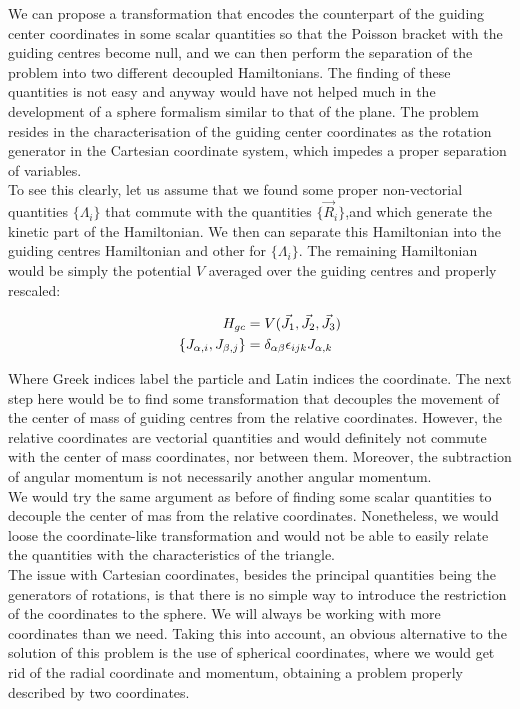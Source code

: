 We can propose a transformation that encodes the counterpart of the guiding center coordinates in some scalar quantities so that the Poisson bracket with the guiding centres become null, and we can then perform the separation of the problem into two different decoupled Hamiltonians. The finding of these quantities is not easy and anyway would have not helped much in the development of a sphere formalism similar to that of the plane. The problem resides in the characterisation of the guiding center coordinates as the rotation generator in the Cartesian coordinate system, which impedes a proper separation of variables.\\

To see this clearly, let us assume that we found some proper non-vectorial quantities $\{\Lambda_i\}$ that commute with the quantities $\{\vec{R}_i\}$,and which generate the kinetic part of the Hamiltonian. We then can separate this Hamiltonian into the guiding centres Hamiltonian and other for $\{\Lambda_i\}$. The remaining Hamiltonian would be simply the potential $V$ averaged over the guiding centres and properly rescaled:

\begin{align*}
H_{gc} &= V(\vec{J_1},\vec{J_2},\vec{J_3})\\
\left\lbrace J_{\alpha,i}, J_{\beta,j} \right\rbrace &= \delta_{\alpha\beta}\epsilon_{ijk} J_{\alpha,k}
\end{align*}

Where Greek indices label the particle and Latin indices the coordinate. The next step here would be to find some transformation that decouples the movement of the center of mass of guiding centres from the relative coordinates. However, the relative coordinates are vectorial quantities and would definitely not commute with the center of mass coordinates, nor between them. Moreover, the subtraction of angular momentum is not necessarily another angular momentum. \\

We would try the same argument as before of finding some scalar quantities to decouple the center of mas from the relative coordinates. Nonetheless, we would loose the coordinate-like transformation and would not be able to easily relate the quantities with the characteristics of the triangle.\\

The issue with Cartesian coordinates, besides the principal quantities being the generators of rotations, is that there is no simple way to introduce the restriction of the coordinates to the sphere. We will always be working with more coordinates than we need. Taking this into account, an obvious alternative to the solution of this problem is the use of spherical coordinates, where we would get rid of the radial coordinate and momentum, obtaining a problem properly described by two coordinates.\\ 

